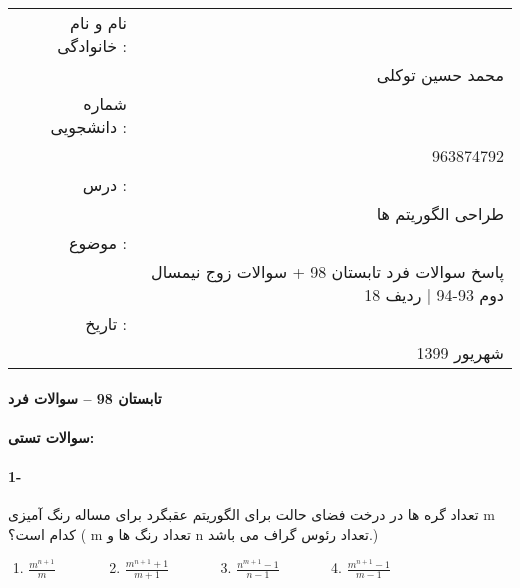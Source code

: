 \documentclass[10pt,a4paper]{article}
\begin{document}
	\begin{table}
		\centering
		\begin{tabular}{r!{\color{c_gold}\vrule width 0.5pt}r}
			\\ \textcolor{c_darkred}{نام و نام خانوادگی :}  &   \\[10pt]
			 & \textcolor{c_skyblue}{محمد حسین توکلی} \\[10pt]
			\textcolor{c_darkred}{شماره دانشجویی :}  &   \\[10pt]
			 & \textcolor{c_skyblue}{963874792} \\[10pt]
			 \textcolor{c_darkred}{درس :}  &   \\[10pt]
			 & \textcolor{c_skyblue}{طراحی الگوریتم ها} \\[10pt]
			 \textcolor{c_darkred}{موضوع :}  &   \\[10pt]
			 & \textcolor{c_skyblue}{پاسخ سوالات فرد تابستان 98 + سوالات زوج نیمسال دوم 93-94 | ردیف 18} \\[10pt]
			 \textcolor{c_darkred}{تاریخ :}  &   \\[10pt]
			 & \textcolor{c_skyblue}{شهریور 1399} \\[10pt]
		\end{tabular}
	\end{table}
	
	\title{}
	\date{}
	
	\maketitle
	\newpage
	

	\paragraph{\textbf{تابستان 98 – سوالات فرد}}
	\paragraph{\textcolor{c_orange}{سوالات تستی:}}




	\paragraph{1-}تعداد گره ها در درخت فضای حالت برای الگوریتم عقبگرد برای مساله رنگ آمیزی m کدام است؟ ( m تعداد رنگ ها و n تعداد رئوس گراف می باشد.)
	
	\begin{flushright} 
		\,\,1. $\frac{m^{n+1}}{m}$\,\,\,\,\,\,\,\,\,\,\,\,\,\,\,\,\,\,\,\,
		\,2. $\frac{m^{n+1}+1}{m+1}$\,\,\,\,\,\,\,\,\,\,\,\,\,\,\,\,\,\,\,\,
		3. $\frac{n^{m+1}-1}{n-1}$\,\,\,\,\,\,\,\,\,\,\,\,\,\,\,\,\,\,\,\,
		\textcolor{c_green}{4. $\frac{m^{n+1}-1}{m-1}$}
	\end{flushright}
	
\end{document}
